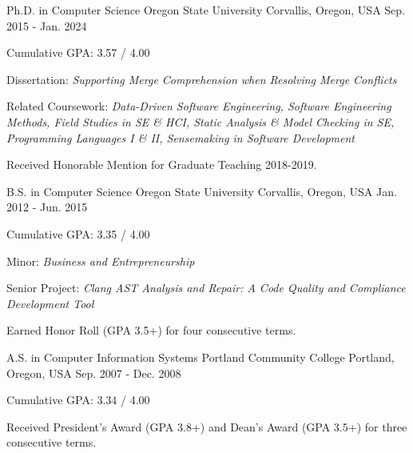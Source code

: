 

\begin{cventries}

  \cventry
    {Ph.D. in Computer Science} %
    {Oregon State University} %
    {Corvallis, Oregon, USA} %
    {Sep. 2015 - Jan. 2024} %
    {
      \begin{cvitems} %
      	\item {Cumulative GPA: 3.57 / 4.00}
      	\item {Dissertation: \textit {Supporting Merge Comprehension when Resolving Merge Conflicts}}
        \item {Related Coursework: \textit {Data-Driven Software Engineering, Software Engineering Methods, Field Studies in SE \& HCI, Static Analysis \& Model Checking in SE, Programming Languages I \& II, Sensemaking in Software Development}}
    \item {Received Honorable Mention for Graduate Teaching 2018-2019.}
      \end{cvitems}
    }
    
    \cventry
    {B.S. in Computer Science} %
    {Oregon State University} %
    {Corvallis, Oregon, USA} %
    {Jan. 2012 - Jun. 2015} %
    {
      \begin{cvitems} %
      	\item {Cumulative GPA: 3.35 / 4.00}
      	\item {Minor: \textit {Business and Entrepreneurship}}
      	\item {Senior Project: \textit{Clang AST Analysis and Repair: A Code Quality and Compliance Development Tool}}
    	\item {Earned Honor Roll (GPA 3.5+) for four consecutive terms.}
      \end{cvitems}
    }

	\cventry
    {A.S. in Computer Information Systems} %
    {Portland Community College} %
    {Portland, Oregon, USA} %
    {Sep. 2007 - Dec. 2008} %
    {
      \begin{cvitems} %
      	\item {Cumulative GPA: 3.34 / 4.00}
    	\item {Received President's Award (GPA 3.8+) and Dean's Award (GPA 3.5+) for three consecutive terms.}
      \end{cvitems}
    }


\end{cventries}
